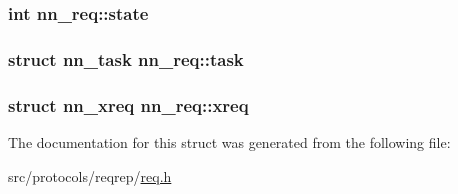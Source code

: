 \subsubsection[{state}]{\setlength{\rightskip}{0pt plus 5cm}int nn\+\_\+req\+::state}\hypertarget{structnn__req_a7d1ed0a033eb20cc5a76570a9dba10fb}{}\label{structnn__req_a7d1ed0a033eb20cc5a76570a9dba10fb}
\subsubsection[{task}]{\setlength{\rightskip}{0pt plus 5cm}struct {\bf nn\+\_\+task} nn\+\_\+req\+::task}\hypertarget{structnn__req_a71406ed3e5197e00395a75044b1b23c8}{}\label{structnn__req_a71406ed3e5197e00395a75044b1b23c8}
\subsubsection[{xreq}]{\setlength{\rightskip}{0pt plus 5cm}struct {\bf nn\+\_\+xreq} nn\+\_\+req\+::xreq}\hypertarget{structnn__req_ac749569e351ea1230dd3a3f4dcfc0365}{}\label{structnn__req_ac749569e351ea1230dd3a3f4dcfc0365}


The documentation for this struct was generated from the following file\+:\begin{DoxyCompactItemize}
\item 
src/protocols/reqrep/\hyperlink{req_8h}{req.\+h}\end{DoxyCompactItemize}
